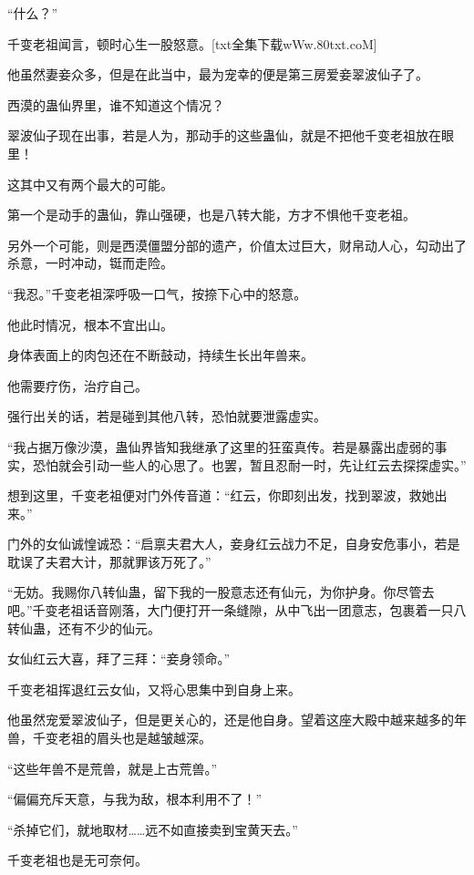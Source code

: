 
\begin{this_body}

“什么？”

千变老祖闻言，顿时心生一股怒意。[txt全集下载wWw.80txt.coM]

他虽然妻妾众多，但是在此当中，最为宠幸的便是第三房爱妾翠波仙子了。

西漠的蛊仙界里，谁不知道这个情况？

翠波仙子现在出事，若是人为，那动手的这些蛊仙，就是不把他千变老祖放在眼里！

这其中又有两个最大的可能。

第一个是动手的蛊仙，靠山强硬，也是八转大能，方才不惧他千变老祖。

另外一个可能，则是西漠僵盟分部的遗产，价值太过巨大，财帛动人心，勾动出了杀意，一时冲动，铤而走险。

“我忍。”千变老祖深呼吸一口气，按捺下心中的怒意。

他此时情况，根本不宜出山。

身体表面上的肉包还在不断鼓动，持续生长出年兽来。

他需要疗伤，治疗自己。

强行出关的话，若是碰到其他八转，恐怕就要泄露虚实。

“我占据万像沙漠，蛊仙界皆知我继承了这里的狂蛮真传。若是暴露出虚弱的事实，恐怕就会引动一些人的心思了。也罢，暂且忍耐一时，先让红云去探探虚实。”

想到这里，千变老祖便对门外传音道：“红云，你即刻出发，找到翠波，救她出来。”

门外的女仙诚惶诚恐：“启禀夫君大人，妾身红云战力不足，自身安危事小，若是耽误了夫君大计，那就罪该万死了。”

“无妨。我赐你八转仙蛊，留下我的一股意志还有仙元，为你护身。你尽管去吧。”千变老祖话音刚落，大门便打开一条缝隙，从中飞出一团意志，包裹着一只八转仙蛊，还有不少的仙元。

女仙红云大喜，拜了三拜：“妾身领命。”

千变老祖挥退红云女仙，又将心思集中到自身上来。

他虽然宠爱翠波仙子，但是更关心的，还是他自身。望着这座大殿中越来越多的年兽，千变老祖的眉头也是越皱越深。

“这些年兽不是荒兽，就是上古荒兽。”

“偏偏充斥天意，与我为敌，根本利用不了！”

“杀掉它们，就地取材……远不如直接卖到宝黄天去。”

千变老祖也是无可奈何。


\end{this_body}
